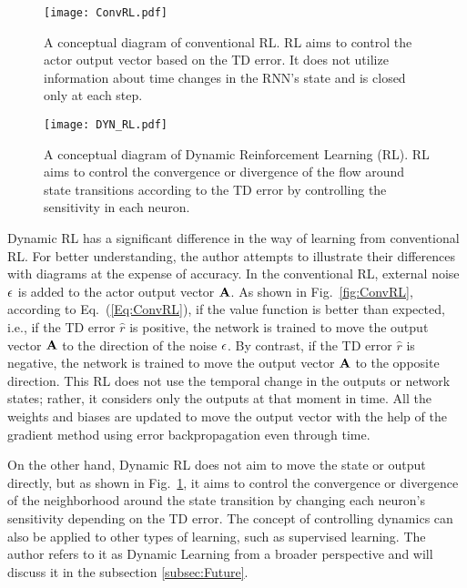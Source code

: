 \begin{figure}[t]
\centerline{\texttt{[image: ConvRL.pdf]}}
\caption{A conceptual diagram of conventional RL.
RL aims to control the actor output vector based on the TD error.
It does not utilize information about time changes in the RNN's state and is closed only at each step.}
\label{fig:ConvRL}
\vspace{5mm}
\centerline{\texttt{[image: DYN\_RL.pdf]}}
\caption{A conceptual diagram of Dynamic Reinforcement Learning (RL).
RL aims to control the convergence or divergence of the flow around state transitions according to the TD error
by controlling the sensitivity in each neuron.}
\label{fig:DYN_RL}
\end{figure}
Dynamic RL has a significant difference in the way of learning
from conventional RL.
For better understanding, the author attempts to illustrate their differences with diagrams at the expense of accuracy.
In the conventional RL, external noise ${\bf \epsilon}$  is added to the actor output vector ${\bf A}$.
As shown in Fig.~\ref{fig:ConvRL}, according to Eq.~(\ref{Eq:ConvRL}),
if the value function is better than expected, i.e., if the TD error $\hat{r}$ is positive,
the network is trained to move the output vector ${\bf A}$ to the direction of the noise ${\bf \epsilon}$.
By contrast, if the TD error $\hat{r}$ is negative, the network is trained to move the output vector ${\bf A}$ to the opposite direction.
This RL does not use the temporal change in the outputs or network states; rather, it considers only the outputs at that moment in time.
All the weights and biases are updated to move the output vector with the help of the gradient method
using error backpropagation even through time.

On the other hand, Dynamic RL does not aim to move the state or output directly,
but as shown in Fig.~\ref{fig:DYN_RL}, it aims to control the convergence or divergence of the neighborhood
around the state transition by changing each neuron's sensitivity depending on the TD error.
The concept of controlling dynamics can also be applied to other types of learning, such as supervised learning.
The author refers to it as Dynamic Learning from a broader perspective and will discuss it in the subsection
\ref{subsec:Future}.

